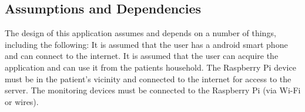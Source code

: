 \subsection{Assumptions and Dependencies}

The design of this application assumes and depends on a number of things,
including the following: It is assumed that the user has a android smart phone and can
connect to the internet. It is assumed that the user can acquire the application
and can use it from the patients household. The Raspberry Pi device must be in the patient's 
vicinity and connected to the internet for access to the server. The monitoring devices must be connected to 
the Raspberry Pi (via Wi-Fi or wires). 